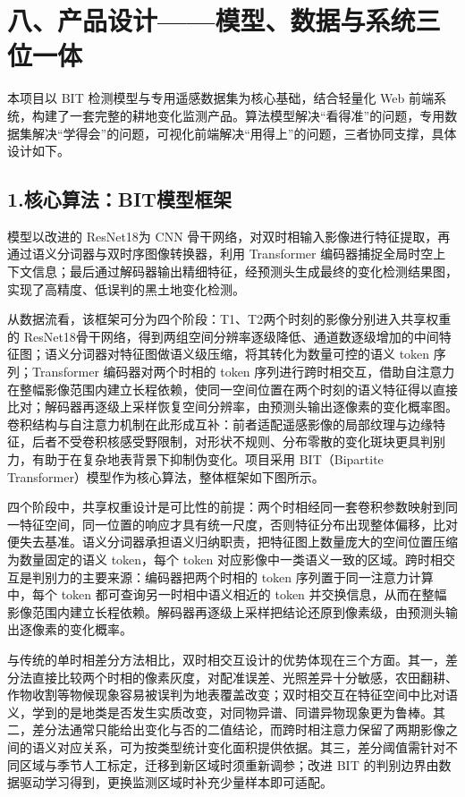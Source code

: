 \section{八、产品设计——模型、数据与系统三位一体}

本项目以 BIT 检测模型与专用遥感数据集为核心基础，结合轻量化 Web 前端系统，构建了一套完整的耕地变化监测产品。算法模型解决“看得准”的问题，专用数据集解决“学得会”的问题，可视化前端解决“用得上”的问题，三者协同支撑，具体设计如下。

\subsection{1.核心算法：BIT模型框架}

模型以改进的 ResNet18为 CNN 骨干网络，对双时相输入影像进行特征提取，再通过语义分词器与双时序图像转换器，利用 Transformer 编码器捕捉全局时空上下文信息；最后通过解码器输出精细特征，经预测头生成最终的变化检测结果图，实现了高精度、低误判的黑土地变化检测。

从数据流看，该框架可分为四个阶段：T1、T2两个时刻的影像分别进入共享权重的 ResNet18骨干网络，得到两组空间分辨率逐级降低、通道数逐级增加的中间特征图；语义分词器对特征图做语义级压缩，将其转化为数量可控的语义 token 序列；Transformer 编码器对两个时相的 token 序列进行跨时相交互，借助自注意力在整幅影像范围内建立长程依赖，使同一空间位置在两个时刻的语义特征得以直接比对；解码器再逐级上采样恢复空间分辨率，由预测头输出逐像素的变化概率图。卷积结构与自注意力机制在此形成互补：前者适配遥感影像的局部纹理与边缘特征，后者不受卷积核感受野限制，对形状不规则、分布零散的变化斑块更具判别力，有助于在复杂地表背景下抑制伪变化。项目采用 BIT（Bipartite Transformer）模型\cite{ref1,ref8}作为核心算法，整体框架如下图所示。

四个阶段中，共享权重设计是可比性的前提：两个时相经同一套卷积参数映射到同一特征空间，同一位置的响应才具有统一尺度，否则特征分布出现整体偏移，比对便失去基准。语义分词器承担语义归纳职责，把特征图上数量庞大的空间位置压缩为数量固定的语义 token，每个 token 对应影像中一类语义一致的区域。跨时相交互是判别力的主要来源：编码器把两个时相的 token 序列置于同一注意力计算中，每个 token 都可查询另一时相中语义相近的 token 并交换信息，从而在整幅影像范围内建立长程依赖。解码器再逐级上采样把结论还原到像素级，由预测头输出逐像素的变化概率。

与传统的单时相差分方法相比，双时相交互设计的优势体现在三个方面。其一，差分法直接比较两个时相的像素灰度，对配准误差、光照差异十分敏感，农田翻耕、作物收割等物候现象容易被误判为地表覆盖改变；双时相交互在特征空间中比对语义，学到的是地类是否发生实质改变，对同物异谱、同谱异物现象更为鲁棒。其二，差分法通常只能给出变化与否的二值结论，而跨时相注意力保留了两期影像之间的语义对应关系，可为按类型统计变化面积提供依据。其三，差分阈值需针对不同区域与季节人工标定，迁移到新区域时须重新调参；改进 BIT 的判别边界由数据驱动学习得到，更换监测区域时补充少量样本即可适配。

